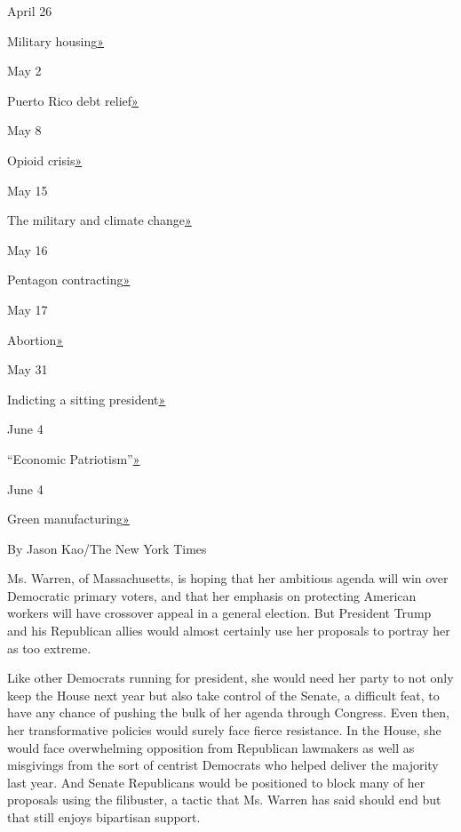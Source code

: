 April 26

Military
housing\href{https://medium.com/@teamwarren/my-plan-to-improve-our-military-housing-b1a46ba235b8}{»}

May 2

Puerto Rico debt
relief\href{https://medium.com/@teamwarren/my-plan-to-provide-comprehensive-debt-relief-to-puerto-rico-f8b575a81b06}{»}

May 8

Opioid
crisis\href{https://medium.com/@teamwarren/my-comprehensive-plan-to-end-the-opioid-crisis-9d85deaa3ccb}{»}

May 15

The military and climate
change\href{https://medium.com/@teamwarren/our-military-can-help-lead-the-fight-in-combating-climate-change-2955003555a3}{»}

May 16

Pentagon
contracting\href{https://medium.com/@teamwarren/its-time-to-reduce-corporate-influence-at-the-pentagon-98f52ee0fcf1}{»}

May 17

Abortion\href{https://medium.com/@teamwarren/congressional-action-to-protect-choice-aaf94ed25fb5}{»}

May 31

Indicting a sitting
president\href{https://medium.com/@teamwarren/no-president-is-above-the-law-f4812e580336}{»}

June 4

``Economic
Patriotism''\href{https://medium.com/@teamwarren/a-plan-for-economic-patriotism-13b879f4cfc7}{»}

June 4

Green
manufacturing\href{https://medium.com/@teamwarren/my-green-manufacturing-plan-for-america-fc0ad53ab614}{»}

By Jason Kao/The New York Times

Ms. Warren, of Massachusetts, is hoping that her ambitious agenda will
win over Democratic primary voters, and that her emphasis on protecting
American workers will have crossover appeal in a general election. But
President Trump and his Republican allies would almost certainly use her
proposals to portray her as too extreme.

Like other Democrats running for president, she would need her party to
not only keep the House next year but also take control of the Senate, a
difficult feat, to have any chance of pushing the bulk of her agenda
through Congress. Even then, her transformative policies would surely
face fierce resistance. In the House, she would face overwhelming
opposition from Republican lawmakers as well as misgivings from the sort
of centrist Democrats who helped deliver the majority last year. And
Senate Republicans would be positioned to block many of her proposals
using the filibuster, a tactic that Ms. Warren has said should end but
that still enjoys bipartisan support.


